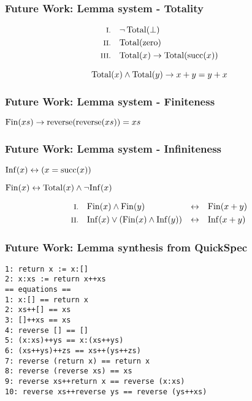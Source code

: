 \documentclass[serif,professionalfont]{beamer}
\begin{document}
\begin{frame}
\frametitle{Future Work: Lemma system - Totality}
\label{sec-6}


\centering
{}

\vspace{\baselineskip}

\begin{align*}
\rom{1} &&        & \neg \, \Total(\bot) \\
\rom{2} &&        & \Total(\fn{zero}) \\
\rom{3} && \fa{x} & \Total(x) \rightarrow \Total(\fn{succ}(x))
\end{align*}

\pause

\begin{equation*}
\faa{x}{y} \Total(x) \wedge \Total(y) \rightarrow x + y = y + x
\end{equation*}
\end{frame}
\begin{frame}
\frametitle{Future Work: Lemma system - Finiteness}
\label{sec-7}


\begin{center}
$\fa{xs} \Fin(xs) \rightarrow \fn{reverse}(\fn{reverse}(xs)) = xs$
\end{center}
\end{frame}
\begin{frame}
\frametitle{Future Work: Lemma system - Infiniteness}
\label{sec-8}


\begin{center}
$\fa{x} \Inf(x) \leftrightarrow (x = \fn{succ}(x))$
\end{center}

\vspace{1\baselineskip}

\pause

\begin{center}
$\Fin(x) \leftrightarrow \Total(x) \wedge \neg \Inf(x)$
\end{center}

\pause

\begin{align*}
\rom{1} && \faa{x}{y} & \Fin(x) \wedge \Fin(y)                & \leftrightarrow &&& \Fin(x + y) \\
\rom{2} && \faa{x}{y} & \Inf(x) \vee (\Fin(x) \wedge \Inf(y)) & \leftrightarrow &&& \Inf(x + y)
\end{align*}
\end{frame}

\begin{frame}[fragile]
\frametitle{Future Work: Lemma synthesis from QuickSpec}

\begin{verbatim}
1: return x := x:[]
2: x:xs := return x++xs
== equations ==
1: x:[] == return x
2: xs++[] == xs
3: []++xs == xs
4: reverse [] == []
5: (x:xs)++ys == x:(xs++ys)
6: (xs++ys)++zs == xs++(ys++zs)
7: reverse (return x) == return x
8: reverse (reverse xs) == xs
9: reverse xs++return x == reverse (x:xs)
10: reverse xs++reverse ys == reverse (ys++xs)
\end{verbatim}
\end{frame}
\end{document}

